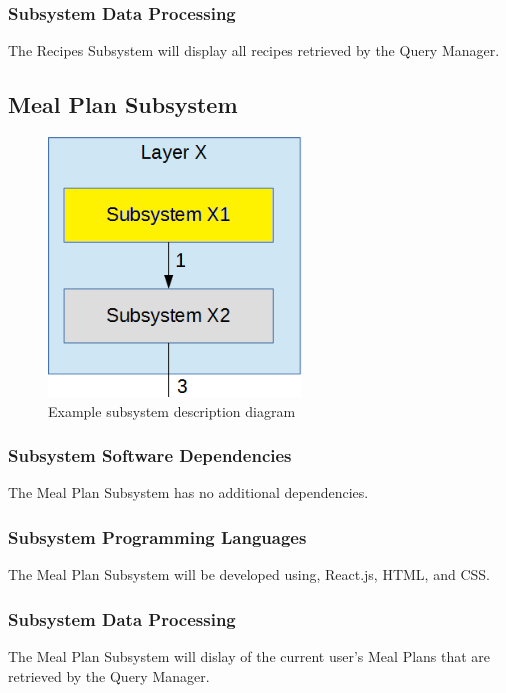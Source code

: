 \subsubsection{Subsystem Data Processing}
The Recipes Subsystem will display all recipes retrieved by the Query Manager.

\subsection{Meal Plan Subsystem}

\begin{figure}[h!]
	\centering
 	\includegraphics[width=0.60\textwidth]{images/subsystem}
 \caption{Example subsystem description diagram}
\end{figure}

\subsubsection{Subsystem Software Dependencies}
The Meal Plan Subsystem has no additional dependencies.

\subsubsection{Subsystem Programming Languages}
The Meal Plan Subsystem will be developed using, React.js, HTML, and CSS.

\subsubsection{Subsystem Data Processing}
The Meal Plan Subsystem will dislay of the current user's Meal Plans that are retrieved by the Query Manager.


